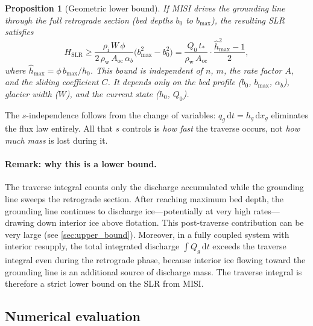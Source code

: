 \documentclass[11pt]{article}
\newtheorem{proposition}{Proposition}
\newcommand{\dd}{\mathrm{d}}
\newcommand{\Qg}{Q_g}
\newcommand{\qg}{q_g}
\newcommand{\hg}{h_g}
\newcommand{\hhat}{\hat{h}}
\newcommand{\xg}{x_g}
\newcommand{\rhoi}{\rho_{\mathrm{i}}}
\newcommand{\rhow}{\rho_{\mathrm{w}}}
\newcommand{\Aoc}{A_{\mathrm{oc}}}
\begin{document}
\begin{proposition}[Geometric lower bound]
\label{prop:lower_bound}
If MISI drives the grounding line through the full retrograde section (bed depths $b_0$ to $b_{\max}$), the resulting SLR satisfies
\begin{equation}
	\boxed{H_{\mathrm{SLR}} \geq \frac{\rhoi\,W\,\phi}{2\,\rhow\,\Aoc\,\alpha_b}\bigl(b_{\max}^2 - b_0^2\bigr) = \frac{Q_0\,t_*}{\rhow\,\Aoc}\cdot\frac{\hhat_{\max}^2 - 1}{2},}
	\label{eq:lower_bound}
\end{equation}
where $\hhat_{\max} = \phi\,b_{\max}/h_0$. This bound is independent of $n$, $m$, the rate factor $A$, and the sliding coefficient $C$. It depends only on the bed profile ($b_0$, $b_{\max}$, $\alpha_b$), glacier width ($W$), and the current state ($h_0$, $Q_0$).
\end{proposition}

\noindent The $s$-independence follows from the change of variables: $\qg\,\dd t = \hg\,\dd\xg$ eliminates the flux law entirely. All that $s$ controls is \emph{how fast} the traverse occurs, not \emph{how much mass} is lost during it.

\paragraph{Remark: why this is a lower bound.} The traverse integral counts only the discharge accumulated while the grounding line sweeps the retrograde section. After reaching maximum bed depth, the grounding line continues to discharge ice---potentially at very high rates---drawing down interior ice above flotation. This post-traverse contribution can be very large (see \cref{sec:upper_bound}). Moreover, in a fully coupled system with interior resupply, the total integrated discharge $\int \Qg\,\dd t$ exceeds the traverse integral even during the retrograde phase, because interior ice flowing toward the grounding line is an additional source of discharge mass. The traverse integral is therefore a strict lower bound on the SLR from MISI.

\subsection{Numerical evaluation}
\end{document}
